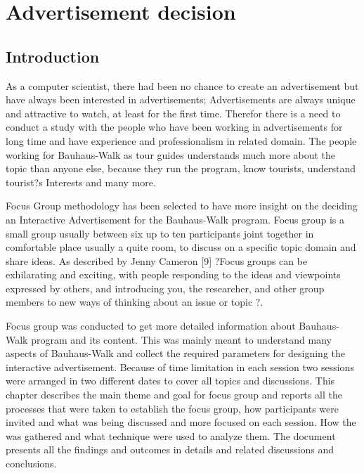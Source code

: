 \chapter{Advertisement decision} %

\label{Chapter4} %




\section{Introduction}

As a computer scientist, there had been no chance to create an advertisement but have always been interested in advertisements; Advertisements are always unique and attractive to watch, at least for the first time. Therefor there is a need to conduct a study with the people who have been working in advertisements for long time and have experience and professionalism in related domain. The people working for Bauhaus-Walk as tour guides understands much more about the topic than anyone else, because they run the program, know tourists, understand tourist?s Interests and many more.

Focus Group methodology has been selected to have more insight on the deciding an Interactive Advertisement for the Bauhaus-Walk program. Focus group is a small group usually between six up to ten participants joint together in comfortable place usually a quite room, to discuss on a specific topic domain and share ideas. As described by Jenny Cameron [9] ?Focus groups can be exhilarating and exciting, with people responding to the ideas and viewpoints expressed by others, and introducing you, the researcher, and other group members to new ways of thinking about an issue or topic ?.

Focus group was conducted to get more detailed information about Bauhaus-Walk program and its content. This was mainly meant to understand many aspects of Bauhaus-Walk and collect the required parameters for designing the interactive advertisement. Because of time limitation in each session two sessions were arranged in two different dates to cover all topics and discussions. This chapter describes the main theme and goal for focus group and reports all the processes that were taken to establish the focus group, how participants were invited and what was being discussed and more focused on each session. How the was gathered and what technique were used to analyze them. The document presents all the findings and outcomes in details and related discussions and conclusions.

